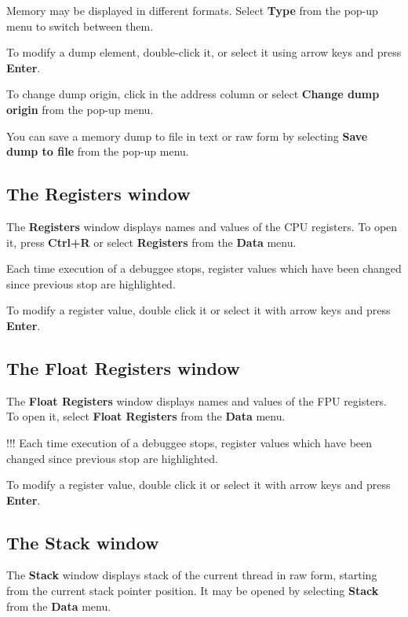 Memory may be displayed in different formats. Select {\bf Type} from
the pop-up menu to switch between them.

To modify a dump element, double-click it, or select it using arrow keys
and press {\bf Enter}.

To change dump origin, click in the address column or select
{\bf Change dump origin} from the pop-up menu.


You can save a memory dump to file in text or raw form by selecting 
{\bf Save dump to file} from the pop-up menu.

\subsection{The Registers window}
\label{dialog:data:registers}

The {\bf Registers} window displays names and values of the CPU registers.
To open it, press {\bf Ctrl+R} or select {\bf Registers} from the {\bf Data}
menu.

Each time execution of a debuggee stops, register values which have been
changed since previous stop are highlighted.

To modify a register value, double click it or select it with arrow keys
and press {\bf Enter}.

\subsection{The Float Registers window}
\label{dialog:data:float}

The {\bf Float Registers} window displays names and values of the FPU registers.
To open it, select {\bf Float Registers} from the {\bf Data} menu.

\ifcomment !!!
Each time execution of a debuggee stops, register values which have been
changed since previous stop are highlighted.
\fi

To modify a register value, double click it or select it with arrow keys
and press {\bf Enter}.

\subsection{The Stack window}
\label{dialog:data:stack}

The {\bf Stack} window displays stack of the current thread in raw form,
starting from the current stack pointer position. It may be opened by selecting
{\bf Stack} from the {\bf Data} menu.


